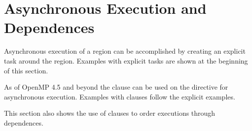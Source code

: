 \pagebreak
\section{Asynchronous  Execution and Dependences}
\label{sec:async_target_exec_depend}

Asynchronous execution of a  region can be accomplished
by creating an explicit task around the  region. Examples
with explicit tasks are shown at the beginning of this section. 

As of OpenMP 4.5 and beyond the  clause can be used on the
 directive for asynchronous execution. Examples with 
 clauses follow the explicit  examples.

This section also shows the use of  clauses to order 
executions through dependences.


